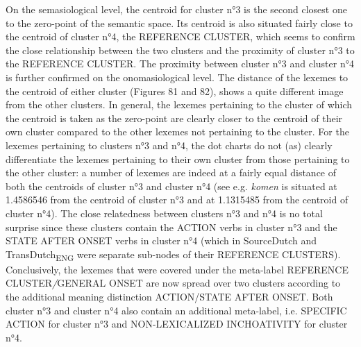 On the semasiological level, the centroid for cluster n°3 is the second closest one to the zero-point of the semantic space. Its centroid is also situated fairly close to the centroid of cluster n°4, the REFERENCE CLUSTER, which seems to confirm the close relationship between the two clusters and the proximity of cluster n°3 to the REFERENCE CLUSTER. The proximity between cluster n°3 and cluster n°4 is further confirmed on the onomasiological level. The distance of the lexemes to the centroid of either cluster (Figures 81 and 82), shows a quite different image from the other clusters. In general, the lexemes pertaining to the cluster of which the centroid is taken as the zero-point are clearly closer to the centroid of their own cluster compared to the other lexemes not pertaining to the cluster. For the lexemes pertaining to clusters n°3 and n°4, the dot charts do not (as) clearly differentiate the lexemes pertaining to their own cluster from those pertaining to the other cluster: a number of lexemes are indeed at a fairly equal distance of both the centroids of cluster n°3 and cluster n°4 (see e.g. \textit{komen} is situated at 1.4586546 from the centroid of cluster n°3 and at 1.1315485 from the centroid of cluster n°4). The close relatedness between clusters n°3 and n°4 is no total surprise since these clusters contain the ACTION verbs in cluster n°3 and the STATE AFTER ONSET verbs in cluster n°4 (which in SourceDutch and TransDutch\textsubscript{ENG} were separate sub-nodes of their REFERENCE CLUSTERS). Conclusively, the lexemes that were covered under the meta-label REFERENCE CLUSTER\textit{/}GENERAL ONSET are now spread over two clusters according to the additional meaning distinction ACTION/STATE AFTER ONSET. Both cluster n°3 and cluster n°4 also contain an additional meta-label, i.e. {SPECIFIC} ACTION for cluster n°3 and {NON-LEXICALIZED INCHOATIVITY} for cluster n°4.

